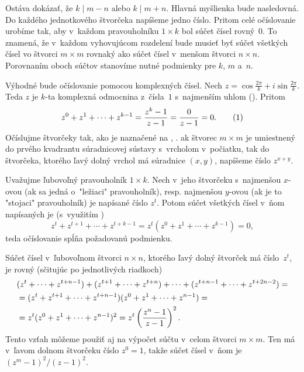 {\smallskip
Ostáva dokázať, že $k\mid m-n$ alebo $k\mid m+n$. Hlavná myšlienka bude nasledovná. Do každého jednotkového štvorčeka napíšeme jedno číslo. Pritom celé očíslovanie urobíme tak, aby v~každom pravouholníku $1\times k$ bol súčet čísel rovný~$0$. To znamená, že v~každom vyhovujúcom rozdelení bude musieť byť súčet všetkých čísel vo štvorci $m\times m$ rovnaký ako súčet čísel v~menšom štvorci $n\times n$. Porovnaním oboch súčtov stanovíme nutné podmienky pre $k$, $m$ a~$n$.

Výhodné bude očíslovanie pomocou komplexných čísel. Nech $z=\cos\frac{2\pi}k+i\sin\frac{2\pi}k$. Teda $z$ je $k$-ta komplexná odmocnina z~čísla~$1$ s~najmenším uhlom (\obr). Pritom
$$
z^0+z^1+\cdots+z^{k-1}=\frac{z^k-1}{z-1}=\frac0{z-1}=0.
\tag1
$$
Očíslujme štvorčeky tak, ako je naznačené na \obr, \tj. ak štvorec $m\times m$ je umiestnený do prvého kvadrantu súradnicovej sústavy s~vrcholom v~počiatku, tak do štvorčeka, ktorého ľavý dolný vrchol má súradnice $(x,y)$, napíšeme číslo $z^{x+y}$.
%

Uvažujme ľubovoľný pravouholník $1\times k$. Nech v~jeho štvorčeku s~najmenšou \hbox{$x$-ovou} (ak sa jedná o~"ležiaci" pravouholník), resp. najmenšou $y$-ovou (ak je to "stojaci" pravouholník) je napísané číslo $z^t$. Potom súčet všetkých čísel v~ňom napísaných je (s~využitím )
$$
z^t+z^{t+1}+\cdots+z^{t+k-1}=z^t(z^0+z^1+\cdots+z^{k-1})=0,
$$
teda očíslovanie spĺňa požadovanú podmienku.

Súčet čísel v~ľubovoľnom štvorci $n\times n$, ktorého ľavý dolný štvorček má číslo~$z^t$, je rovný (sčitujúc po jednotlivých riadkoch)
$$
\aligned
&(z^t+\cdots+z^{t+n-1})+(z^{t+1}+\cdots+z^{t+n})+\cdots+(z^{t+n-1}+\cdots+z^{t+2n-2})=\\
&=(z^t+z^{t+1}+\cdots+z^{t+n-1})(z^0+z^1+\cdots+z^{n-1})=\\
&=z^t(z^0+z^1+\cdots+z^{n-1})^2=z^t\left(\frac{z^n-1}{z-1}\right)^2.
\endaligned
$$
Tento vzťah môžeme použiť aj na výpočet súčtu v~celom štvorci $m\times m$. Ten má v~ľavom dolnom štvorčeku číslo $z^0=1$, takže súčet čísel v~ňom je $(z^m-1)^2/(z-1)^2$.

}
